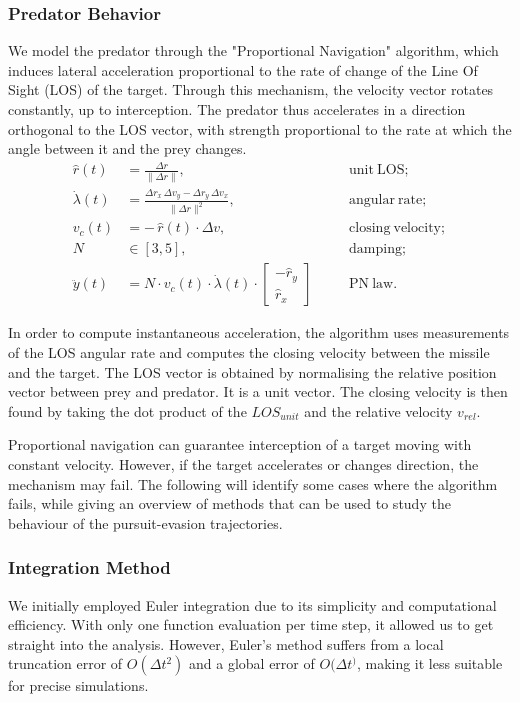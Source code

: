 \documentclass[11pt, twocolumn]{article}
\begin{document}
    \subsubsection{Predator Behavior}
    We model the predator through the "Proportional Navigation" algorithm, which induces lateral acceleration proportional to the rate of change of the Line Of Sight (LOS) of the target. Through this mechanism, the velocity vector rotates constantly, up to interception. The predator thus accelerates in a direction orthogonal to the LOS vector, with strength proportional to the rate at which the angle between it and the prey changes.
    \[
      \begin{aligned}
        \hat r(t) &= \frac{\Delta r}{\|\Delta r\|},
        &\quad &\mathrm{unit\ LOS};\\
        \dot\lambda(t) &= \frac{\Delta r_x\,\Delta v_y - \Delta r_y\,\Delta v_x}{\|\Delta r\|^2},
        &\quad &\mathrm{angular\ rate};\\
        v_c(t) &= -\,\hat r(t)\cdot\Delta v,
        &\quad &\mathrm{closing\ velocity};\\
        N &\in [3,5],
        &\quad &\mathrm{damping};\\
        \ddot{y}(t) &= N \cdot v_c(t) \cdot \dot{\lambda}(t) \cdot
        \begin{bmatrix} -\hat{r}_y \\ \hat{r}_x
        \end{bmatrix}
        &\quad &\mathrm{PN\ law}.
      \end{aligned}
    \]

    In order to compute instantaneous acceleration, the algorithm uses measurements of the LOS angular rate and computes the closing velocity between the missile and the target. The LOS vector is obtained by normalising the relative position vector between prey and predator. It is a unit vector. The closing velocity is then found by taking the dot product of the $\textit{LOS}_{unit}$ and the relative velocity $\textit{v}_{rel}$.

    Proportional navigation can guarantee interception of a target moving with constant velocity. However, if the target accelerates or changes direction, the mechanism may fail. The following will identify some cases where the algorithm fails, while giving an overview of methods that can be used to study the behaviour of the pursuit-evasion trajectories.

    \subsubsection{Integration Method}
    We initially employed Euler integration due to its simplicity and computational efficiency. With only one function evaluation per time step, it allowed us to get straight into the analysis. However, Euler's method suffers from a local truncation error of $O(\Delta t^2)$ and a global error of $O(\Delta t^)$, making it less suitable for precise simulations.
\end{document}
